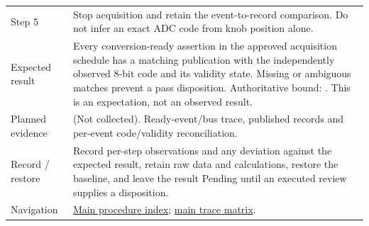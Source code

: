 \begin{tabularx}{\linewidth}{L{3.2cm}Y}
Step 5 & Stop acquisition and retain the event-to-record comparison. Do not infer an exact ADC code from knob position alone.\\
Expected result & Every conversion-ready assertion in the approved acquisition schedule has a matching publication with the independently observed 8-bit code and its validity state. Missing or ambiguous matches prevent a pass disposition. Authoritative bound: . This is an expectation, not an observed result.\\
Planned evidence &  (Not collected). Ready-event/bus trace, published records and per-event code/validity reconciliation.\\
Record / restore & Record per-step observations and any deviation against the expected result, retain raw data and calculations, restore the baseline, and leave the result Pending until an executed review supplies a disposition.\\
Navigation & \hyperref[Table:WeekTwoTests]{Main procedure index}; \hyperref[Table:TraceabilityMatrix]{main trace matrix}.\\
\end{tabularx}
\normalsize
